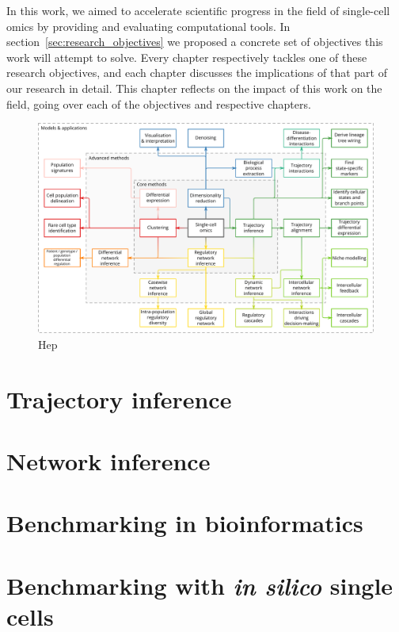 

In this work, we aimed to accelerate scientific progress in the field of single-cell omics by providing and evaluating computational tools. In section~\ref{sec:research_objectives} we proposed a concrete set of objectives this work will attempt to solve. Every chapter respectively tackles one of these research objectives, and each chapter discusses the implications of that part of our research in detail. This chapter reflects on the impact of this work on the field, going over each of the objectives and respective chapters. 


\begin{figure}[htb!]
	\centering
	\includegraphics[width=\linewidth]{fig/singlecell_technologies_v7.pdf}
	\caption{Hep}
	\label{fig:singlecell_technologies}
\end{figure}

\section{Trajectory inference}

\section{Network inference}

\section{Benchmarking in bioinformatics}






\section{Benchmarking with \textit{in silico} single cells}

